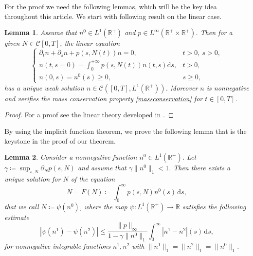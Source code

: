 \documentclass[11pt,a4paper]{article}
\newcommand{\R}{\mathbb{R}}
\newcommand{\dd}{\mathrm{d}}
\newtheorem{lemma}{Lemma}[section]
\begin{document}
For the proof we need the following lemmas, which will be the key idea throughout this article. We start with following result on the linear case.

\begin{lemma}
Assume that $n^0\in L^1(\R^+)$ and $p\in L^\infty(\R^+\times\R^+)$. Then for a given $N\in\mathcal{C}[0,T]$, the linear equation
\begin{equation}
\label{linearaux}
\begin{cases}
    \partial_tn+\partial_s n+p(s,N(t))n = 0,  & t>0,\: s>0, \\
    n(t,s=0)=\int_0^{+\infty}p(s,N(t))n(t,s) \dd s,& t>0,\\
    n(0,s)=n^0(s)\geq0,& s\geq 0,
    \end{cases}    
\end{equation}
has a unique weak solution $n\in\mathcal{C}([0,T],L^1(\R^+))$. Moreover $n$ is nonnegative and verifies the mass conservation property \eqref{massconservation} for $t\in[0,T]$.
\end{lemma}
\begin{proof}
    For a proof see the linear theory developed in \cite{perthame2006transport,pakdaman2009dynamics,canizo2019asymptotic}.
\end{proof}

By using the implicit function theorem, we prove the following lemma that is the keystone in the proof of our theorem.

\begin{lemma}
\label{fixedpoint-itm}
    Consider a nonnegative function $n^0\in L^1(\R^+)$. Let $\gamma \coloneqq \sup_{s,N}\partial_N p(s,N)$ and assume that $\gamma\|n^0\|_1<1$. Then there exists a unique solution for $N$ of the equation
    \begin{equation}
    \label{eqfix-N}
        N=F(N)\coloneqq \int_0^\infty p(s,N)n^0(s)\,\dd s,
    \end{equation}
    that we call $N\coloneqq\psi(n^0)$, where the map $\psi\colon L^1(\R^+)\to\R$ satisfies the following estimate
    \begin{equation}
    \label{psi-lip-l1}
        |\psi(n^1)-\psi(n^2)|\le \frac{\|p\|_\infty}{1-\gamma\|n^0\|_1}\int_0^\infty|n^1-n^2|(s)\,\dd s,
    \end{equation}
    for nonnegative integrable functions $n^1,n^2$ with $\|n^1\|_1=\|n^2\|_1=\|n^0\|_1$.
\end{lemma}
\end{document}
